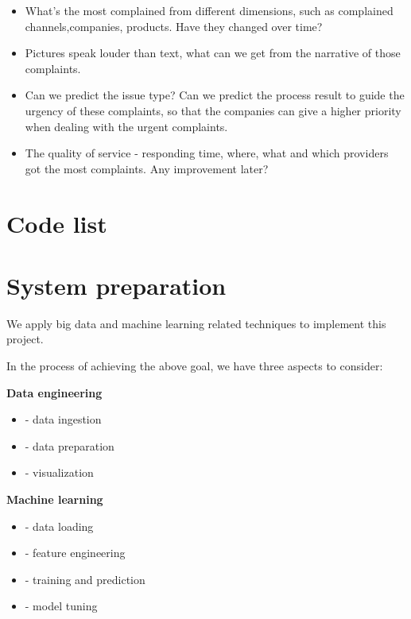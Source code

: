\documentclass[conference]{IEEEtran}
\begin{document}
\begin{itemize}
\item What's the most complained from different dimensions, such as complained channels,companies, products. Have they changed over time?

\item Pictures speak louder than text, what can we get from the narrative of those complaints.

\item Can we predict the issue type? Can we predict the process result to guide the urgency of these complaints, so that the companies can give a  higher priority when dealing with the urgent complaints.
\item The quality of service - responding time, where, what and which providers got the most complaints. Any improvement later? 

\end{itemize}

\section{Code list}

\section{System preparation}\label{AA}
We apply big data and machine learning related techniques to implement this project. 

In the process of achieving the above goal, we have three aspects to consider:

\textbf{Data engineering
}\begin{itemize}
\item  - data ingestion
\item - data preparation 
\item - visualization
\end{itemize}


\textbf{Machine learning
}\begin{itemize}
\item  - data loading
\item - feature engineering
\item - training and prediction
\item - model tuning 
\end{itemize}
\end{document}
